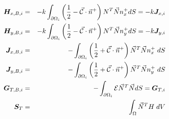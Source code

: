 \begin{footnotesize}
\begin{eqnarray}
{\bm H}_{x,B,i} &=&     -k\int_{\partial\Omega_i}  \left( \frac{1}{2} - \vec{\cal C} \cdot \vec{n}^+ \right) {N}^T \vec{N} n^+_x dS = -k {\bm J}_{x,i}\\
{\bm H}_{y,B,i} &=&     -k\int_{\partial\Omega_i}  \left( \frac{1}{2} - \vec{\cal C} \cdot \vec{n}^+ \right) {N}^T \vec{N} n^+_y dS = -k {\bm J}_{y,i}\\
{\bm J}_{x,B,i} &=&     -\int_{\partial\Omega_i} \left(\frac{1}{2} + \vec{\cal{C}} \cdot \vec{n}^+ \right) \vec{N}^T \vec{N} {n}_x^+    \; dS \\
{\bm J}_{y,B,i} &=&     -\int_{\partial\Omega_i} \left(\frac{1}{2} + \vec{\cal{C}} \cdot \vec{n}^+ \right) \vec{N}^T \vec{N} {n}_y^+    \; dS \\
{\bm G}_{T,B,i} &=&   -\int_{\partial\Omega_i}   {\cal{E}}   \vec{N}^T \vec{N} dS  = {\bm G}_{T,i}\\
{\bm S}_{T} &=&        \int_{\Omega} \vec{N}^T H  \;dV  
\end{eqnarray}
\end{footnotesize}








